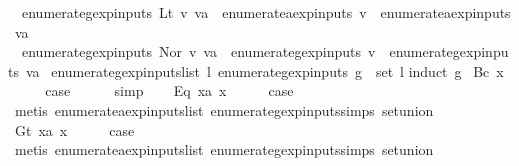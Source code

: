 \begin{isabellebody}
\ \ {\isachardoublequoteopen}enumerate{\isacharunderscore}gexp{\isacharunderscore}inputs\ {\isacharparenleft}Lt\ v\ va{\isacharparenright}\ {\isacharequal}\ enumerate{\isacharunderscore}aexp{\isacharunderscore}inputs\ v\ {\isasymunion}\ enumerate{\isacharunderscore}aexp{\isacharunderscore}inputs\ va{\isachardoublequoteclose}\ {\isacharbar}\isanewline
\ \ {\isachardoublequoteopen}enumerate{\isacharunderscore}gexp{\isacharunderscore}inputs\ {\isacharparenleft}Nor\ v\ va{\isacharparenright}\ {\isacharequal}\ enumerate{\isacharunderscore}gexp{\isacharunderscore}inputs\ v\ {\isasymunion}\ enumerate{\isacharunderscore}gexp{\isacharunderscore}inputs\ va{\isachardoublequoteclose}\isanewline
\isanewline
{}\isamarkupfalse%
\ enumerate{\isacharunderscore}gexp{\isacharunderscore}inputs{\isacharunderscore}list{\isacharcolon}\ {\isachardoublequoteopen}{\isasymexists}l{\isachardot}\ enumerate{\isacharunderscore}gexp{\isacharunderscore}inputs\ g\ {\isacharequal}\ set\ l{\isachardoublequoteclose}\isanewline
%
\isadelimproof
%
\endisadelimproof
%
\isatagproof
{}\isamarkupfalse%
{\isacharparenleft}induct\ g{\isacharparenright}\isanewline
{}\isamarkupfalse%
\ {\isacharparenleft}Bc\ x{\isacharparenright}\isanewline
\ \ \isamarkupfalse%
\ \isamarkupfalse%
\ {\isacharquery}case\isanewline
\ \ \ \ \isamarkupfalse%
\ simp\isanewline
{}\isamarkupfalse%
\isanewline
\ \ \isamarkupfalse%
\ {\isacharparenleft}Eq\ x{}a\ x{}{\isacharparenright}\isanewline
\ \ \isamarkupfalse%
\ \isamarkupfalse%
\ {\isacharquery}case\isanewline
\ \ \ \ \isamarkupfalse%
\ {\isacharparenleft}metis\ enumerate{\isacharunderscore}aexp{\isacharunderscore}inputs{\isacharunderscore}list\ enumerate{\isacharunderscore}gexp{\isacharunderscore}inputs{\isachardot}simps{\isacharparenleft}{}{\isacharparenright}\ set{\isacharunderscore}union{\isacharparenright}\isanewline
{}\isamarkupfalse%
\isanewline
\ \ \isamarkupfalse%
\ {\isacharparenleft}Gt\ x{}a\ x{}{\isacharparenright}\isanewline
\ \ \isamarkupfalse%
\ \isamarkupfalse%
\ {\isacharquery}case\isanewline
\ \ \ \ \isamarkupfalse%
\ {\isacharparenleft}metis\ enumerate{\isacharunderscore}aexp{\isacharunderscore}inputs{\isacharunderscore}list\ enumerate{\isacharunderscore}gexp{\isacharunderscore}inputs{\isachardot}simps{\isacharparenleft}{}{\isacharparenright}\ set{\isacharunderscore}union{\isacharparenright}\isanewline

\end{isabellebody}
